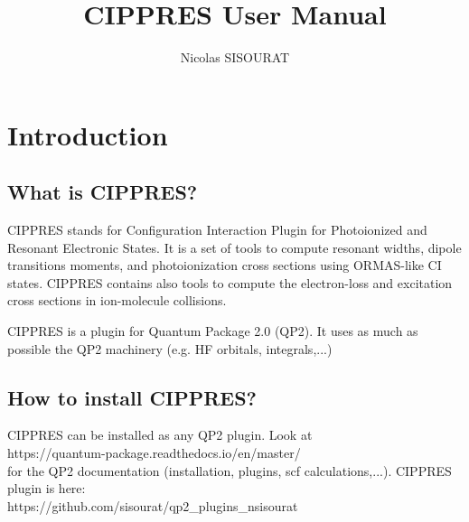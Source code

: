 \documentclass[a4paper, 10 pt]{report}
\begin{document}
\title{CIPPRES User Manual}
\author{Nicolas SISOURAT}
\maketitle
\pagestyle{empty}



\tableofcontents
\newpage

\chapter{Introduction}

\section{What is CIPPRES?}

CIPPRES stands for Configuration Interaction Plugin for Photoionized and Resonant Electronic States. It is a set of tools to compute resonant widths, dipole transitions moments, and photoionization cross sections using ORMAS-like CI states. CIPPRES contains also tools to compute the electron-loss and excitation cross sections in ion-molecule collisions.

CIPPRES is a plugin for Quantum Package 2.0 (QP2). It uses as much as possible the QP2 machinery (e.g. HF orbitals, integrals,...)

\section{How to install CIPPRES?}

CIPPRES can be installed as any QP2 plugin. Look at \\
https://quantum-package.readthedocs.io/en/master/ \\
for the QP2 documentation (installation, plugins, scf calculations,...). CIPPRES plugin is here:\\ https://github.com/sisourat/qp2\_plugins\_nsisourat
\end{document}
